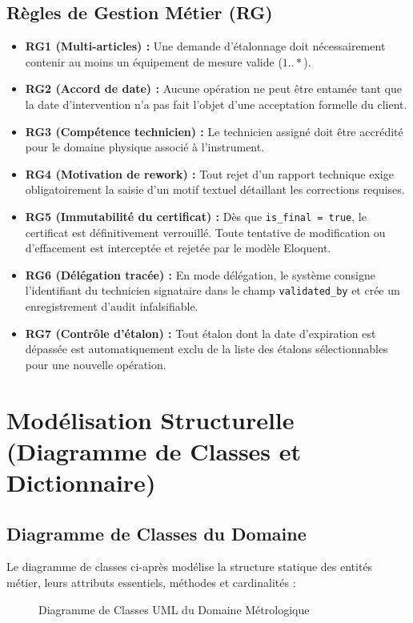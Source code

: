 \documentclass{bts-report}
\begin{document}
\subsection{R\`egles de Gestion M\'etier (RG)}
\begin{itemize}
  \item \textbf{RG1 (Multi-articles) :} Une demande d'\'etalonnage doit n\'ecessairement contenir au moins un \'equipement de mesure valide ($1..*$).
  \item \textbf{RG2 (Accord de date) :} Aucune op\'eration ne peut \^etre entam\'ee tant que la date d'intervention n'a pas fait l'objet d'une acceptation formelle du client.
  \item \textbf{RG3 (Comp\'etence technicien) :} Le technicien assign\'e doit \^etre accr\'edit\'e pour le domaine physique associ\'e \`a l'instrument.
  \item \textbf{RG4 (Motivation de rework) :} Tout rejet d'un rapport technique exige obligatoirement la saisie d'un motif textuel d\'etaillant les corrections requises.
  \item \textbf{RG5 (Immutabilit\'e du certificat) :} D\`es que \texttt{is\_final = true}, le certificat est d\'efinitivement verrouill\'e. Toute tentative de modification ou d'effacement est intercept\'ee et rejet\'ee par le mod\`ele Eloquent.
  \item \textbf{RG6 (D\'el\'egation trac\'ee) :} En mode d\'el\'egation, le syst\`eme consigne l'identifiant du technicien signataire dans le champ \texttt{validated\_by} et cr\'ee un enregistrement d'audit infalsifiable.
  \item \textbf{RG7 (Contr\^ole d'\'etalon) :} Tout \'etalon dont la date d'expiration est d\'epass\'ee est automatiquement exclu de la liste des \'etalons s\'electionnables pour une nouvelle op\'eration.
\end{itemize}

\section{Mod\'elisation Structurelle (Diagramme de Classes et Dictionnaire)}
\subsection{Diagramme de Classes du Domaine}
Le diagramme de classes ci-apr\`es mod\'elise la structure statique des entit\'es m\'etier, leurs attributs essentiels, m\'ethodes et cardinalit\'es :

\begin{figure}[H]
  \centering
  
  \caption{Diagramme de Classes UML du Domaine M\'etrologique}
  \label{fig:class-domain}
\end{figure}
\end{document}
